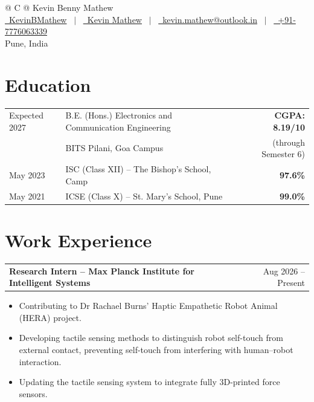 \documentclass[a4paper,12pt]{article}
\makeatletter
\newenvironment{joblong}[2]
    {\begin{tabularx}{\linewidth}{@{}l X r@{}} \textbf{#1} & \hfill &  #2 \\[3.75pt] \end{tabularx}
    \begin{minipage}[t]{\linewidth}\raggedright
    \begin{itemize}[nosep,after=\strut, leftmargin=1em, itemsep=3pt,label=--]}
    {\end{itemize} \end{minipage}}
\makeatother
\begin{document}
\pagestyle{empty} 
\raggedright

\begin{tabularx}{\linewidth}{@{} C @{}}
\Huge{Kevin Benny Mathew} \\[7.5pt]
\href{https://github.com/KevinBMathew}{\raisebox{-0.05\height}\faGithub\ KevinBMathew} \ $|$ \ 
\href{https://linkedin.com/in/kevin-mathew-672774249}{\raisebox{-0.05\height}\faLinkedin\ Kevin Mathew} \ $|$ \ 
\href{mailto:kevin.mathew@outlook.in}{\raisebox{-0.05\height}\faEnvelope \ kevin.mathew@outlook.in} \ $|$ \ 
\href{tel:+917776063339}{\raisebox{-0.05\height}\faMobile \ +91-7776063339} \\
\normalsize{Pune, India}
\end{tabularx}

\section{Education}
\begin{tabularx}{\linewidth}{@{}l X r@{}}	
Expected 2027 & B.E. (Hons.) Electronics and Communication Engineering & \textbf{CGPA: 8.19/10} \\
& BITS Pilani, Goa Campus & \small{(through Semester 6)}\\
May 2023 & ISC (Class XII) -- The Bishop's School, Camp & \textbf{97.6\%} \\
May 2021 & ICSE (Class X) -- St. Mary's School, Pune & \textbf{99.0\%} \\
\end{tabularx}

\section{Work Experience}
\begin{joblong}{Research Intern -- Max Planck Institute for Intelligent Systems \href{https://is.mpg.de/hi/research_projects/haptic-empathetic-robot-animal-hera}{\raisebox{-0.05\height}\faGlobe}}{Aug 2026 -- Present}
\item Contributing to Dr Rachael Burns' Haptic Empathetic Robot Animal (HERA) project.
\item Developing tactile sensing methods to distinguish robot self-touch from external contact, preventing self-touch from interfering with human--robot interaction.
\item Updating the tactile sensing system to integrate fully 3D-printed force sensors.
\end{joblong}
\end{document}
